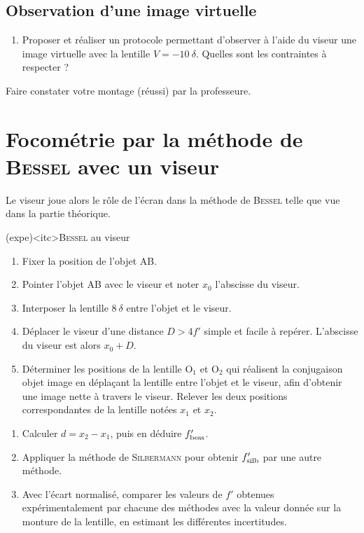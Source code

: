 \documentclass[../main/main.tex]{subfiles}
\begin{document}
\subsection{Observation d'une image virtuelle}

\begin{enumerate}[label=\clenumi, start=7]
	\item Proposer et réaliser un protocole permettant d'observer à l'aide du
	      viseur une image virtuelle avec la lentille $V = \SI{-10}{\delta}$.
	      Quelles sont les contraintes à respecter ?
\end{enumerate}
Faire constater votre montage (réussi) par la professeure.

\section{Focométrie par la méthode de \textsc{Bessel} avec un viseur}

Le viseur joue alors le rôle de l'écran dans la méthode de \textsc{Bessel} telle que vue dans la partie théorique.

\begin{tcb}(expe)<itc>{\textsc{Bessel} au viseur}
	\begin{enumerate}
		\item Fixer la position de l'objet AB.
		\item Pointer l'objet AB avec le viseur et noter $x_0$ l'abscisse du
		      viseur.
		\item Interposer la lentille $\SI{8}{\delta}$ entre l'objet et le viseur.
		\item Déplacer le viseur d'une distance $D > 4f'$ simple et facile à
		      repérer. L'abscisse du viseur est alors $x_0 + D$.
		\item Déterminer les positions de la lentille O$_1$ et O$_2$ qui réalisent
		      la conjugaison objet image en déplaçant la lentille entre l'objet et le
		      viseur, afin d'obtenir une image nette à travers le viseur. Relever les
		      deux positions correspondantes de la lentille notées $x_1$ et $x_2$.
	\end{enumerate}
\end{tcb}

\begin{enumerate}[label=\sqenumi, start=8]
	\item Calculer $d = x_2-x_1$, puis en déduire $f'_{\rm bess}$.
	\item Appliquer la méthode de \textsc{Silbermann} pour obtenir $f'_{\rm silb}$
	      par une autre méthode.
	\item Avec l'écart normalisé, comparer les valeurs de $f'$ obtenues
	      expérimentalement par chacune des méthodes avec la valeur donnée sur la
	      monture de la lentille, en estimant les différentes incertitudes.
\end{enumerate}
\end{document}
